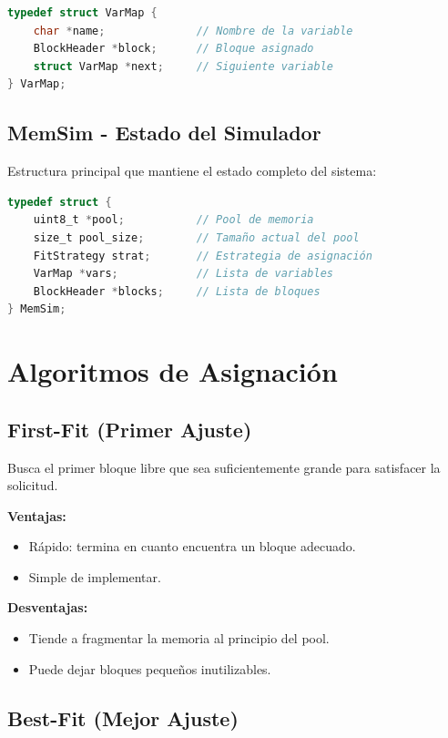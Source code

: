 \documentclass[12pt,a4paper]{article}
\begin{document}
\begin{lstlisting}[language=C]
typedef struct VarMap {
    char *name;              // Nombre de la variable
    BlockHeader *block;      // Bloque asignado
    struct VarMap *next;     // Siguiente variable
} VarMap;
\end{lstlisting}

\subsection{MemSim - Estado del Simulador}

Estructura principal que mantiene el estado completo del sistema:

\begin{lstlisting}[language=C]
typedef struct {
    uint8_t *pool;           // Pool de memoria
    size_t pool_size;        // Tamaño actual del pool
    FitStrategy strat;       // Estrategia de asignación
    VarMap *vars;            // Lista de variables
    BlockHeader *blocks;     // Lista de bloques
} MemSim;
\end{lstlisting}

\section{Algoritmos de Asignación}

\subsection{First-Fit (Primer Ajuste)}

Busca el primer bloque libre que sea suficientemente grande para satisfacer la solicitud.

\textbf{Ventajas:}
\begin{itemize}
    \item Rápido: termina en cuanto encuentra un bloque adecuado.
    \item Simple de implementar.
\end{itemize}

\textbf{Desventajas:}
\begin{itemize}
    \item Tiende a fragmentar la memoria al principio del pool.
    \item Puede dejar bloques pequeños inutilizables.
\end{itemize}

\subsection{Best-Fit (Mejor Ajuste)}
\end{document}
